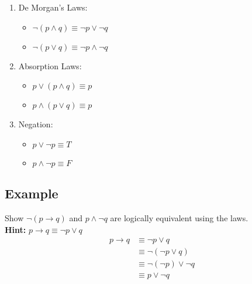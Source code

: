 \documentclass[letterpaper, 12pt]{math}
\begin{document}
\begin{enumerate}
  \item De Morgan's Laws:
  \begin{itemize}
    \item \( \neg{(p \wedge q)} \equiv \neg{p} \vee \neg{q} \)
    \item \( \neg{(p \vee q)} \equiv \neg{p} \wedge \neg{q} \)
  \end{itemize}
  \item Absorption Laws:
  \begin{itemize}
    \item \( p \vee (p \wedge q) \equiv p \)
    \item \( p \wedge (p \vee q) \equiv p \)
  \end{itemize}
  \item Negation:
  \begin{itemize}
    \item \( p \vee \neg{p} \equiv T \)
    \item \( p \wedge \neg{p} \equiv F \)
  \end{itemize}
\end{enumerate}

\subsection*{Example}
Show \( \neg{(p \to q)} \) and \( p \wedge \neg{q} \) are logically equivalent
using the laws. \\
\textbf{Hint:} \( p \to q \equiv \neg{p} \vee q \)
\begin{align*}
  p \to q &\equiv \neg{p} \vee q \\
  &\equiv \neg{(\neg{p} \vee q)} \\
  &\equiv \neg{(\neg{p})} \vee \neg{q} \\
  &\equiv p \vee \neg{q}
\end{align*}
\end{document}
